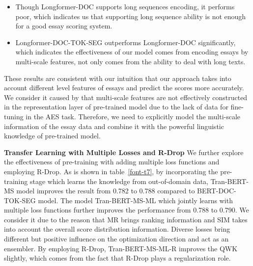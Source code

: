 \documentclass[11pt]{article}
\begin{document}
\begin{itemize}
\item Though Longformer-DOC supports long sequences encoding, it performs poor, which indicates us that supporting long sequence ability is not enough for a good essay scoring system.

\item Longformer-DOC-TOK-SEG outperforms Longformer-DOC significantly, which indicates the effectiveness of our model comes from encoding essays by multi-scale features, not only comes from the ability to deal with long texts.
\end{itemize}

These results are consistent with our intuition that our approach takes into account different level features of essays and predict the scores more accurately. 
We consider it caused by that multi-scale features are not effectively constructed in the representation layer of pre-trained model due to the lack of data for fine-tuning in the AES task.
Therefore, we need to explicitly model the multi-scale information of the essay data and combine it with the powerful linguistic knowledge of pre-trained model.

\begin{table}[h!]
\begin{center}
\end{center}
\caption{\label{font-t7} Experiment results for transfer learning with multiple loss functions and R-Drop .}
\end{table}

\textbf{Transfer Learning with Multiple Losses and R-Drop}
We further explore the effectiveness of pre-training with adding multiple loss functions and employing R-Drop. 
As is shown in table~\ref{font-t7}, by incorporating the pre-training stage which learns the knowledge from out-of-domain data, Tran-BERT-MS model improves the result from 0.782 to 0.788 compared to BERT-DOC-TOK-SEG model.
The model Tran-BERT-MS-ML which jointly learns with multiple loss functions further improves the performance from 0.788 to 0.790.
We consider it due to the reason that MR brings ranking information and SIM takes into account the overall score distribution information.
Diverse losses bring different but positive influence on the optimization direction and act as an ensembler.
By employing R-Drop, Tran-BERT-MS-ML-R improves the QWK slightly, which comes from the fact that R-Drop plays a regularization role.  
\end{document}
